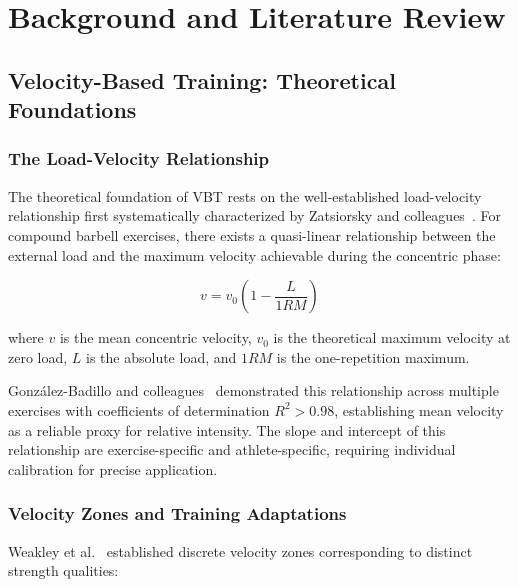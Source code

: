 
\chapter{Background and Literature Review} \label{chap:background}

\section{Velocity-Based Training: Theoretical Foundations}

\subsection{The Load-Velocity Relationship}

The theoretical foundation of VBT rests on the well-established load-velocity relationship first systematically characterized by Zatsiorsky and colleagues~\cite{zatsiorsky1995}. For compound barbell exercises, there exists a quasi-linear relationship between the external load and the maximum velocity achievable during the concentric phase:

\begin{equation}
    v = v_0 \left(1 - \frac{L}{1RM}\right)
\end{equation}

where $v$ is the mean concentric velocity, $v_0$ is the theoretical maximum velocity at zero load, $L$ is the absolute load, and $1RM$ is the one-repetition maximum.

Gonz{\'a}lez-Badillo and colleagues~\cite{gonzalez-badillo2010} demonstrated this relationship across multiple exercises with coefficients of determination $R^2 > 0.98$, establishing mean velocity as a reliable proxy for relative intensity. The slope and intercept of this relationship are exercise-specific and athlete-specific, requiring individual calibration for precise application.

\subsection{Velocity Zones and Training Adaptations}

Weakley et al.~\cite{weakley2021} established discrete velocity zones corresponding to distinct strength qualities:

